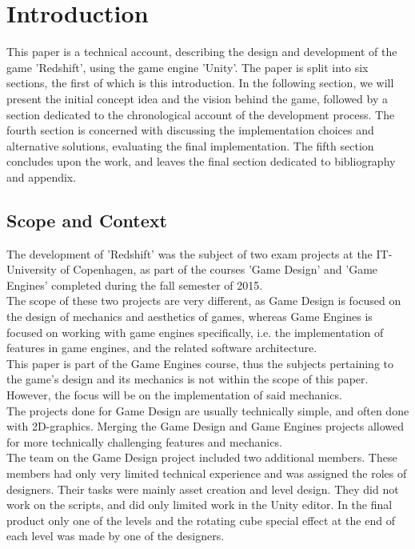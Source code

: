 \section{Introduction}
 This paper is a technical account, describing the design and development of the game 'Redshift', using the game engine 'Unity'. The paper is split into six sections, the first of which is this introduction. In the following section, we will present the initial concept idea and the vision behind the game, followed by a section dedicated to the chronological account of the development process. The fourth section is concerned with discussing the implementation choices and alternative solutions, evaluating the final implementation. The fifth section concludes upon the work, and leaves the final section dedicated to bibliography and appendix.
 
\subsection{Scope and Context}
The development of 'Redshift' was the subject of two exam projects at the IT-University of Copenhagen, as part of the courses 'Game Design' and 'Game Engines' completed during the fall semester of 2015.\\

The scope of these two projects are very different, as Game Design is focused on the design of mechanics and aesthetics of games, whereas Game Engines is focused on working with game engines specifically, i.e. the implementation of features in game engines, and the related software architecture.\\

This paper is part of the Game Engines course, thus the subjects pertaining to the game's design and its mechanics is not within the scope of this paper. However, the focus will be on the implementation of said mechanics.\\

The projects done for Game Design are usually technically simple, and often done with 2D-graphics. Merging the Game Design and Game Engines projects allowed for more technically challenging features and mechanics.\\

The team on the Game Design project included two additional members. These members had only very limited technical experience and was assigned the roles of designers. Their tasks were mainly asset creation and level design. They did not work on the scripts, and did only limited work in the Unity editor. In the final product only one of the levels and the rotating cube special effect at the end of each level was made by one of the designers.



